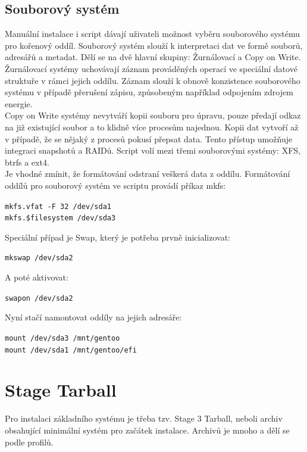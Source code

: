 \documentclass[12pt,a4paper,twoside,]{article}
\begin{document}
{\subsection{\textsf{Souborový systém}}\hypertarget{Souborový systém}{}
Manuální instalace i script dávají uživateli možnost vyběru souborového systému pro kořenový oddíl.
Souborový systém slouží k interpretaci dat ve formě souborů, adresářů a metadat. Dělí se na dvě hlavní skupiny: Žurnálovací a Copy on Write.\\
Žurnálovací systémy uchovávají záznam prováděných operací ve speciální datové struktuře v rámci jejich oddílu. 
Záznam slouží k obnově konzistence souborového systému v případě přerušení zápisu, způsobeným například odpojením zdrojem energie. \\
Copy on Write systémy nevytváří kopii souboru pro úpravu, pouze předají odkaz na již existující soubor a to klidně více procesům najednou.
Kopii dat vytvoří až v případě, že se nějaký z procesů pokusí přepsat data. Tento přístup umožňuje integraci snapshotů a RAIDů.
Script volí mezi třemi souborovými systémy: XFS, btrfs a ext4. \\Je vhodné zmínit, že formátování odstraní veškerá data z oddílu. 
Formátování oddílů pro souborový systém ve scriptu provádí příkaz mkfs: 

\texttt{mkfs.vfat -F 32 /dev/sda1}\\
\texttt{\hspace*{1.5em}mkfs.\$filesystem /dev/sda3}

\hspace*{-1.5em}Speciální případ je Swap, který je potřeba prvně inicializovat: 

\texttt{mkswap /dev/sda2}

\hspace*{-1.5em}A poté aktivovat:

\texttt{swapon /dev/sda2}

\hspace*{-1.5em}Nyní stačí namontovat oddíly na jejich adresáře:

\texttt{mount /dev/sda3 /mnt/gentoo}\\
\texttt{\hspace*{1.5em}mount /dev/sda1 /mnt/gentoo/efi}

\newpage
\section{\textsf{Stage Tarball}}
{Pro instalaci základního systému je třeba tzv. Stage 3 Tarball, neboli archiv obsahující
minimální systém pro začátek instalace. Archivů je mnoho a dělí se podle profilů.

}}
\end{document}

